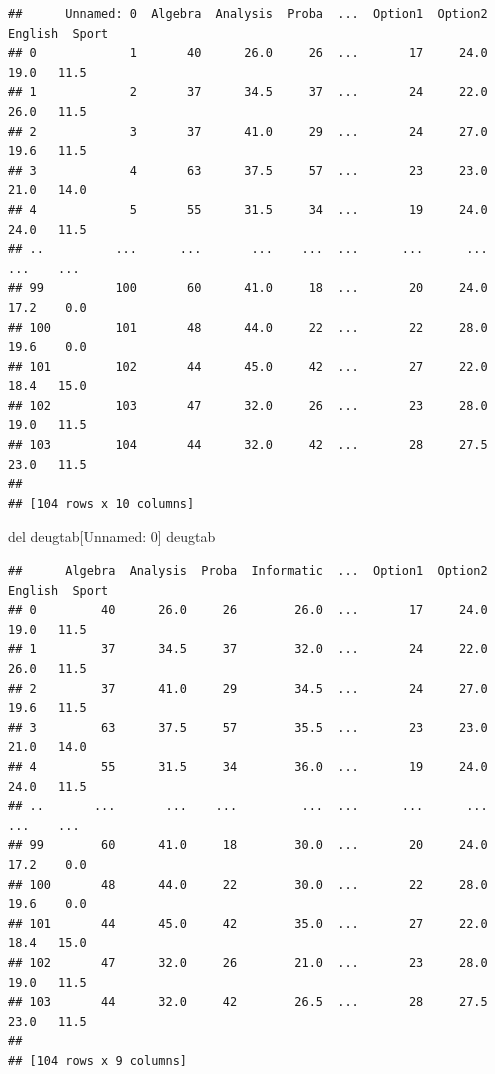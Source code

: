 \documentclass[
  10pt,
]{article}
\newenvironment{Shaded}{\begin{snugshade}}{\end{snugshade}}
\newcommand{\NormalTok}[1]{#1}
\begin{document}
\begin{verbatim}
##      Unnamed: 0  Algebra  Analysis  Proba  ...  Option1  Option2  English  Sport
## 0             1       40      26.0     26  ...       17     24.0     19.0   11.5
## 1             2       37      34.5     37  ...       24     22.0     26.0   11.5
## 2             3       37      41.0     29  ...       24     27.0     19.6   11.5
## 3             4       63      37.5     57  ...       23     23.0     21.0   14.0
## 4             5       55      31.5     34  ...       19     24.0     24.0   11.5
## ..          ...      ...       ...    ...  ...      ...      ...      ...    ...
## 99          100       60      41.0     18  ...       20     24.0     17.2    0.0
## 100         101       48      44.0     22  ...       22     28.0     19.6    0.0
## 101         102       44      45.0     42  ...       27     22.0     18.4   15.0
## 102         103       47      32.0     26  ...       23     28.0     19.0   11.5
## 103         104       44      32.0     42  ...       28     27.5     23.0   11.5
## 
## [104 rows x 10 columns]
\end{verbatim}

\begin{Shaded}
\begin{Highlighting}[]
\NormalTok{del deugtab[\textquotesingle{}Unnamed: 0\textquotesingle{}]}
\NormalTok{deugtab}
\end{Highlighting}
\end{Shaded}

\begin{verbatim}
##      Algebra  Analysis  Proba  Informatic  ...  Option1  Option2  English  Sport
## 0         40      26.0     26        26.0  ...       17     24.0     19.0   11.5
## 1         37      34.5     37        32.0  ...       24     22.0     26.0   11.5
## 2         37      41.0     29        34.5  ...       24     27.0     19.6   11.5
## 3         63      37.5     57        35.5  ...       23     23.0     21.0   14.0
## 4         55      31.5     34        36.0  ...       19     24.0     24.0   11.5
## ..       ...       ...    ...         ...  ...      ...      ...      ...    ...
## 99        60      41.0     18        30.0  ...       20     24.0     17.2    0.0
## 100       48      44.0     22        30.0  ...       22     28.0     19.6    0.0
## 101       44      45.0     42        35.0  ...       27     22.0     18.4   15.0
## 102       47      32.0     26        21.0  ...       23     28.0     19.0   11.5
## 103       44      32.0     42        26.5  ...       28     27.5     23.0   11.5
## 
## [104 rows x 9 columns]
\end{verbatim}
\end{document}
